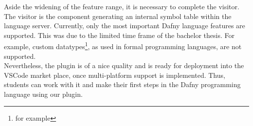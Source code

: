 Aside the widening of the feature range, it is necessary to complete the visitor.
The visitor is the component generating an internal symbol table within the language server.
Currently, only the most important Dafny language features are supported.
This was due to the limited time frame of the bachelor thesis.
For example, custom datatypes\footnote{for example }, as used in formal programming languages, are not supported.\\

Nevertheless, the plugin is of a nice quality and is ready for deployment into the VSCode market place, once multi-platform support is implemented.
Thus, students can work with it and make their first steps in the Dafny programming language using our plugin.